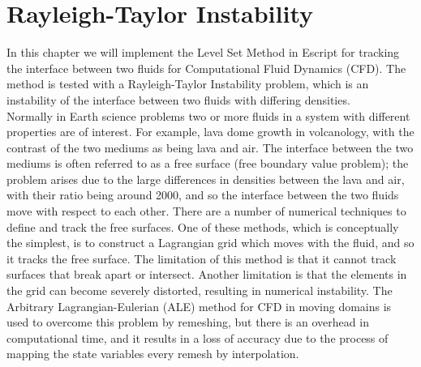 
%
%
%


\section{Rayleigh-Taylor Instability}
\label{LEVELSET CHAP}

In this chapter we will implement the Level Set Method in Escript for tracking the interface between two fluids for Computational Fluid Dynamics (CFD). The method is tested with a Rayleigh-Taylor Instability problem, which is an instability of the interface between two fluids with differing densities. \\ 
Normally in Earth science problems two or more fluids in a system with different properties are of interest. For example, lava dome growth in volcanology, with the contrast of the two mediums as being lava and air. The interface between the two mediums is often referred to as a free surface (free boundary value problem); the problem arises due to the large differences in densities between the lava and air, with their ratio being around 2000, and so the interface between the two fluids move with respect to each other.  
There are a number of numerical techniques to define and track the free surfaces. One of these methods, which is conceptually the simplest, is to construct a Lagrangian grid which moves with the fluid, and so it tracks the free surface. The limitation of this method is that it cannot track surfaces that break apart or intersect. Another limitation is that the elements in the grid can become severely distorted, resulting in numerical instability. The Arbitrary Lagrangian-Eulerian (ALE) method for CFD in moving domains is used to overcome this problem by remeshing, but there is an overhead in computational time, and it results in a loss of accuracy due to the process of mapping the state variables every remesh by interpolation.

